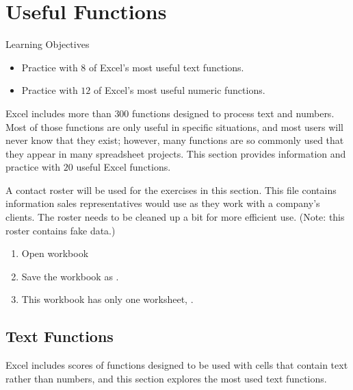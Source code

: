 \section{Useful Functions}

\begin{center}
	\begin{objbox}{Learning Objectives}
		\begin{itemize}
			\setlength{\itemsep}{0pt}
			\setlength{\parskip}{0pt}
			\setlength{\parsep}{0pt}
			
			\item Practice with $ 8 $ of Excel's most useful text functions.
			\item Practice with $ 12 $ of Excel's most useful numeric functions.
			
		\end{itemize}
	\end{objbox}
\end{center}

Excel includes more than $ 300 $ functions designed to process text and numbers. Most of those functions are only useful in specific situations, and most users will never know that they exist; however, many functions are so commonly used that they appear in many spreadsheet projects. This section provides information and practice with $ 20 $ useful Excel functions.

A contact roster will be used for the exercises in this section. This file contains information sales representatives would use as they work with a company's clients. The roster needs to be cleaned up a bit for more efficient use. (Note: this roster contains fake data.)

\begin{enumbox}
	\begin{enumerate}
		\item Open workbook 
		\item Save the workbook as .
		\item This workbook has only one worksheet, .
	\end{enumerate}
\end{enumbox}

\subsection{Text Functions}

Excel includes scores of functions designed to be used with cells that contain text rather than numbers, and this section explores the most used text functions.

